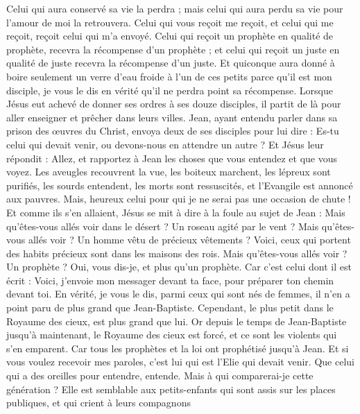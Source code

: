 \begin{multicols}{2}
Celui qui aura conservé sa vie la perdra ; mais celui qui aura perdu sa vie pour l'amour de moi la retrouvera.
Celui qui vous reçoit me reçoit, et celui qui me reçoit, reçoit celui qui m'a envoyé.
Celui qui reçoit un prophète en qualité de prophète, recevra la récompense d'un prophète ; et celui qui reçoit un juste en qualité de juste recevra la récompense d'un juste.
Et quiconque aura donné à boire seulement un verre d'eau froide à l’un de ces petits parce qu’il est mon disciple, je vous le dis en vérité qu'il ne perdra point sa récompense.
\VerseOne{}Lorsque Jésus eut achevé de donner ses ordres à ses douze disciples, il partit de là pour aller enseigner et prêcher dans leurs villes.
Jean, ayant entendu parler dans sa prison des œuvres du Christ, envoya deux de ses disciples pour lui dire :
Es-tu celui qui devait venir, ou devons-nous en attendre un autre ?
Et Jésus leur répondit : Allez, et rapportez à Jean les choses que vous entendez et que vous voyez.
Les aveugles recouvrent la vue, les boiteux marchent, les lépreux sont purifiés, les sourds entendent, les morts sont ressuscités, et l'Evangile est annoncé aux pauvres{}.
Mais, heureux celui pour qui je ne serai pas une occasion de chute !
Et comme ils s'en allaient, Jésus se mit à dire à la foule au sujet de Jean : Mais qu'êtes-vous allés voir dans le désert ? Un roseau agité par le vent ?
Mais qu'êtes-vous allés voir ? Un homme vêtu de précieux vêtements ? Voici, ceux qui portent des habits précieux sont dans les maisons des rois.
Mais qu'êtes-vous allés voir ? Un prophète ? Oui, vous dis-je, et plus qu'un prophète.
Car c’est celui dont il est écrit : Voici, j'envoie mon messager{} devant ta face, pour préparer ton chemin devant toi.
En vérité, je vous le dis, parmi ceux qui sont nés de femmes, il n'en a point paru de plus grand que Jean-Baptiste. Cependant, le plus petit dans le Royaume des cieux, est plus grand que lui.
Or depuis le temps de Jean-Baptiste jusqu’à maintenant, le Royaume des cieux est forcé, et ce sont les violents qui s’en emparent.
Car tous les prophètes et la loi ont prophétisé jusqu'à Jean.
Et si vous voulez recevoir mes paroles, c'est lui qui est l'Elie{} qui devait venir.
Que celui qui a des oreilles pour entendre, entende.
Mais à qui comparerai-je cette génération ? Elle est semblable aux petits-enfants qui sont assis sur les places publiques, et qui crient à leurs compagnons

\end{multicols}
